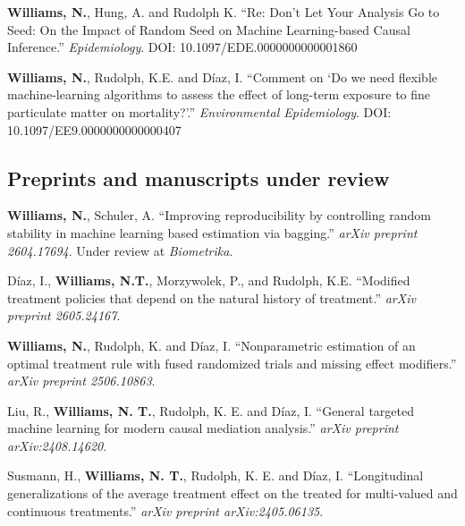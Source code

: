 \documentclass[12pt,letterpaper]{report}
\begin{document}
    \begin{tablist}
    
       \item[2025] \tab \textbf{Williams, N.}, Hung, A. and Rudolph K. \enquote{Re: Don’t Let Your Analysis Go to Seed: On the Impact of Random Seed on Machine Learning-based Causal Inference.} \textit{Epidemiology}. DOI: 10.1097/EDE.0000000000001860
   
   	\item[2025]\tab \textbf{Williams, N.}, Rudolph, K.E. and Díaz, I. \enquote{Comment on `Do we need flexible machine-learning algorithms to assess the effect of long-term exposure to fine particulate matter on mortality?'.} \textit{Environmental Epidemiology}. DOI: 10.1097/EE9.0000000000000407
    
    \end{tablist}
    
    \subsection*{Preprints and manuscripts under review}
        
    \begin{tablist}
    
    \item[2026] \tab \textbf{Williams, N.}, Schuler, A. \enquote{Improving reproducibility by controlling random stability in machine learning based estimation via bagging.} \textit{arXiv preprint 2604.17694}. Under review at \textit{Biometrika}.
    
    \item[2026] \tab Díaz, I., \textbf{Williams, N.T.}, Morzywolek, P., and Rudolph, K.E. \enquote{Modified treatment policies that depend on the natural history of treatment.} \textit{arXiv preprint 2605.24167}.
    
     \item[2025] \tab \textbf{Williams, N.}, Rudolph, K. and Díaz, I. \enquote{Nonparametric estimation of an optimal treatment rule with fused randomized trials and missing effect modifiers.} \textit{arXiv preprint 2506.10863}.
    
    \item[2024] \tab Liu, R., \textbf{Williams, N. T.}, Rudolph, K. E. and Díaz, I. \enquote{General targeted machine learning for modern causal mediation analysis.} \textit{arXiv preprint arXiv:2408.14620}.
    
    \item[2024] \tab Susmann, H., \textbf{Williams, N. T.}, Rudolph, K. E. and Díaz, I. \enquote{Longitudinal generalizations of the average treatment effect on the treated for multi-valued and continuous treatments.} \textit{arXiv preprint arXiv:2405.06135}.
    
    \end{tablist}
    
\end{document}
